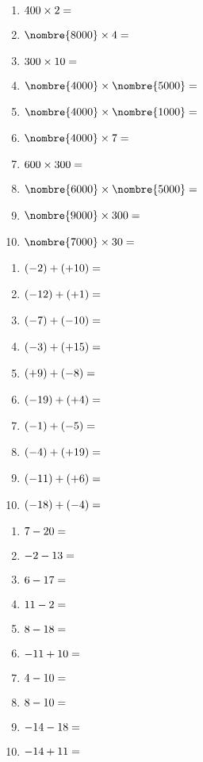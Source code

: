 \documentclass[a4paper,11pt,fleqn]{article}
\begin{document}
\newpage
\setcounter{section}{0}


\begin{multicols}{2}
\begin{enumerate}[itemsep=2em]
	\item $ 400 \times 2 = \dotfill $
	\item $ \nombre{8000} \times 4 = \dotfill $
	\item $ 300 \times 10 = \dotfill $
	\item $ \nombre{4000} \times \nombre{5000} = \dotfill $
	\item $ \nombre{4000} \times \nombre{1000} = \dotfill $
	\item $ \nombre{4000} \times 7 = \dotfill $
	\item $ 600 \times 300 = \dotfill $
	\item $ \nombre{6000} \times \nombre{5000} = \dotfill $
	\item $ \nombre{9000} \times 300 = \dotfill $
	\item $ \nombre{7000} \times 30 = \dotfill $
\end{enumerate}
\end{multicols}


\begin{multicols}{2}
\begin{enumerate}[itemsep=2em]
	\item $ (-2) + (+10) = \dotfill $
	\item $ (-12) + (+1) = \dotfill $
	\item $ (-7) + (-10) = \dotfill $
	\item $ (-3) + (+15) = \dotfill $
	\item $ (+9) + (-8) = \dotfill $
	\item $ (-19) + (+4) = \dotfill $
	\item $ (-1) + (-5) = \dotfill $
	\item $ (-4) + (+19) = \dotfill $
	\item $ (-11) + (+6) = \dotfill $
	\item $ (-18) + (-4) = \dotfill $
\end{enumerate}
\end{multicols}


\begin{multicols}{2}
\begin{enumerate}[itemsep=2em]
	\item $ 7-20 = \dotfill $
	\item $ -2-13 = \dotfill $
	\item $ 6-17 = \dotfill $
	\item $ 11-2 = \dotfill $
	\item $ 8-18 = \dotfill $
	\item $ -11+10 = \dotfill $
	\item $ 4-10 = \dotfill $
	\item $ 8-10 = \dotfill $
	\item $ -14-18 = \dotfill $
	\item $ -14+11 = \dotfill $
\end{enumerate}
\end{multicols}
\end{document}
